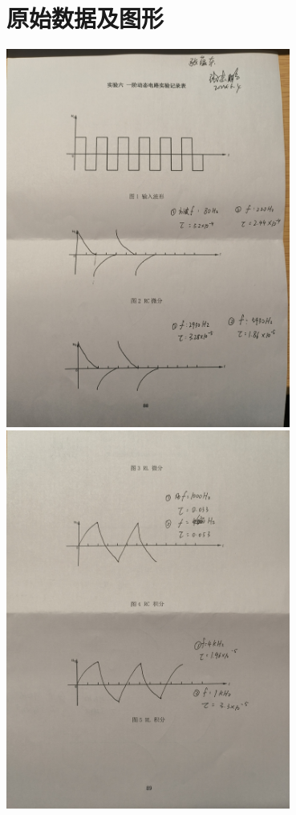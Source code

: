 \documentclass[a4paper,utf8]{article}
\begin{document}
    \section{原始数据及图形}
    \begin{center}
        \includegraphics[width=0.7\textwidth]{7.jpg}\\
        \includegraphics[width=0.7\textwidth]{8.jpg}
    \end{center}

    
\end{document}
